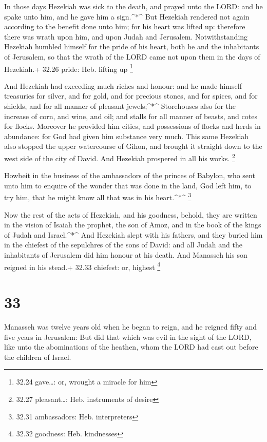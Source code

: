  In those days Hezekiah was sick to the death, and prayed
unto the LORD: and he spake unto him, and he gave him a sign.\^{}*\^{}
 But Hezekiah rendered not again according to the benefit
done unto him; for his heart was lifted up: therefore there was wrath
upon him, and upon Judah and Jerusalem.  Notwithstanding
Hezekiah humbled himself for the pride of his heart, both he and the
inhabitants of Jerusalem, so that the wrath of the LORD came not upon
them in the days of Hezekiah.+ 32.26 pride: Heb. lifting up \footnote{32.24
  gave\ldots: or, wrought a miracle for him}

 And Hezekiah had exceeding much riches and honour: and he
made himself treasuries for silver, and for gold, and for precious
stones, and for spices, and for shields, and for all manner of pleasant
jewels;\^{}*\^{}  Storehouses also for the increase of
corn, and wine, and oil; and stalls for all manner of beasts, and cotes
for flocks.  Moreover he provided him cities, and
possessions of flocks and herds in abundance: for God had given him
substance very much.  This same Hezekiah also stopped the
upper watercourse of Gihon, and brought it straight down to the west
side of the city of David. And Hezekiah prospered in all his works.
\footnote{32.27 pleasant\ldots: Heb. instruments of desire}

 Howbeit in the business of the ambassadors of the princes
of Babylon, who sent unto him to enquire of the wonder that was done in
the land, God left him, to try him, that he might know all that was in
his heart.\^{}*\^{} \footnote{32.31 ambassadors: Heb. interpreters}

 Now the rest of the acts of Hezekiah, and his goodness,
behold, they are written in the vision of Isaiah the prophet, the son of
Amoz, and in the book of the kings of Judah and Israel.\^{}*\^{}
 And Hezekiah slept with his fathers, and they buried him
in the chiefest of the sepulchres of the sons of David: and all Judah
and the inhabitants of Jerusalem did him honour at his death. And
Manasseh his son reigned in his stead.+ 32.33 chiefest: or, highest
\footnote{32.32 goodness: Heb. kindnesses}

\hypertarget{section-32}{%
\section{33}\label{section-32}}

 Manasseh was twelve years old when he began to reign, and
he reigned fifty and five years in Jerusalem:  But did that
which was evil in the sight of the LORD, like unto the abominations of
the heathen, whom the LORD had cast out before the children of Israel.

